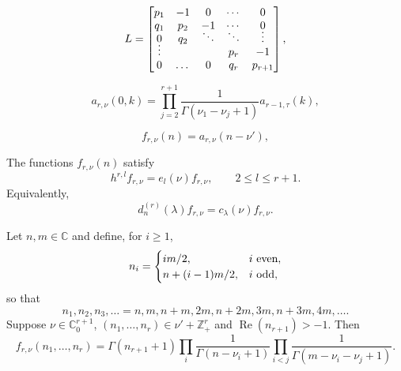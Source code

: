 \documentclass[10pt,a4paper]{amsart}
\newcommand\Z{{\mathbb Z}}
\newcommand{\C}{{\mathbb C}}
\begin{document}
\begin{equation}\label{lax}
L=\begin{bmatrix} p_1 & -1 & 0 & \cdots & 0\\
q_1 & p_2 & -1 & \cdots & 0\\
0 & q_2 & \smash{\ddots} & \smash{\ddots} & \smash{\vdots}\\
\smash{\vdots}&&&p_r&-1\\
0&\dots&0&q_r &p_{r+1} \end{bmatrix},
\end{equation}

\begin{equation}\label{ar0}
a_{r,\nu}(0,k)=\prod_{j=2}^{r+1} \frac{1}{\Gamma(\nu_1-\nu_j+1)} a_{r-1,\tau}(k),
\end{equation}

\begin{equation}\label{fa} f_{r,\nu}(n)= a_{r,\nu}(n-\nu'), \end{equation}

\begin{thm}\label{jef-f}
The functions $f_{r,\nu}(n)$ satisfy
\begin{equation}
h^{r,l} f_{r,\nu} = e_l(\nu) f_{r,\nu}, \qquad 2\le l\le r+1.
\end{equation}
Equivalently,
\begin{equation}\label{jef-f2} d^{(r)}_n(\lambda) f_{r,\nu}= c_\lambda(\nu) f_{r,\nu}.\end{equation}
 \end{thm}

\begin{thm}\label{ff} Let $n,m\in\C$ and define, for $i\ge 1$,
\[ n_i=\begin{cases}
 im/2 ,& i \mbox{ \rm even},\\ n+(i-1)m/2, & i \mbox{ \rm odd},\end{cases}\]
so that
\begin{equation}\label{n1n2} n_1,n_2,n_3,\ldots =n,m,n+m,2m,n+2m,3m,n+3m,4m,\ldots . \end{equation}
Suppose $\nu\in\C_0^{r+1}$, $(n_1,\dots,n_r)\in \nu'+\Z_+^{r}$ and $\operatorname{Re}(n_{r+1})>-1$. Then
\[f_{r,\nu}(n_1,\dots,n_r) = \Gamma(n_{r+1}+1) \prod_i \frac1{\Gamma(n-\nu_i+1) }\prod_{i<j} \frac1{\Gamma(m-\nu_i-\nu_j+1)}.\]
\end{thm}
\end{document}
